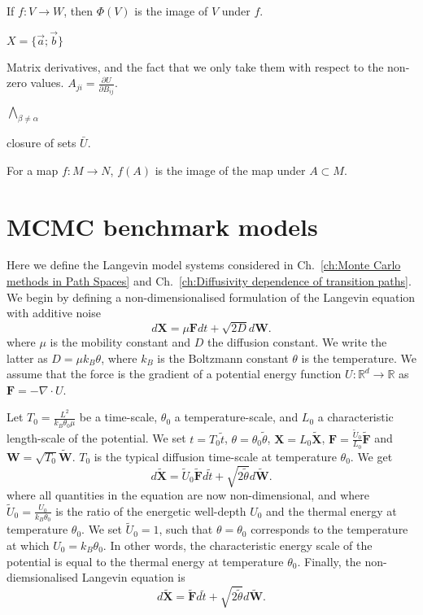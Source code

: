 \documentclass[withindex,glossary,techreport]{cam-thesis}
\begin{document}
If $f : V \to W$, then $\Phi(V)$ is the image of $V$ under $f$. 

$X = \{ \vec{a} ; \vec{b} \}$


Matrix derivatives, and the fact that we only take them with respect to the non-zero values. $A_{ji} = \frac{\partial U}{\partial B_{ij}}$.

$\bigwedge_{\beta \neq \alpha}$

closure of sets $\bar{U}$.

For a map $f : M \to N$, $f(A)$ is the image of the map under $A \subset M$.

\chapter{MCMC benchmark models} \label{app:MCMC benchmark models}

Here we define the Langevin model systems considered in Ch.~\ref{ch:Monte Carlo methods in Path Spaces} and Ch.~\ref{ch:Diffusivity dependence of transition paths}. We begin by defining a non-dimensionalised formulation of the Langevin equation with additive noise
\begin{equation}
d\mathbf{X}=\mu\mathbf{F}dt+\sqrt{2D}d\mathbf{W}.
\end{equation}
where $\mu$ is the mobility constant and $D$ the diffusion constant. We write the latter as $D = \mu k_B \theta$, where $k_B$ is the Boltzmann constant $\theta$ is the temperature. We assume that the force is the gradient of a potential energy function $U : \mathbb{R}^d \to \mathbb{R}$  as $\mathbf{F} = - \nabla \cdot U$.

Let $T_{0}=\frac{L^{2}}{k_{B}\theta_{0}\mu}$ be a time-scale, $\theta_{0}$ a temperature-scale, and $L_0$ a characteristic length-scale of the potential. We set $t=T_{0}\tilde{t}$,
$\theta=\theta_{0}\tilde{\theta}$, $\mathbf{X}=L_0 \tilde{\mathbf{X}}$,
$\mathbf{F}= \frac{\tilde{U}_0}{L_0} \tilde{\mathbf{F}}$ and $\mathbf{W}=\sqrt{T_{0}}\tilde{\mathbf{W}}$. $T_{0}$ is the typical diffusion time-scale at temperature $\theta_{0}$. We get
\begin{equation}
	d\mathbf{\tilde{X}}=\tilde{U}_{0} \tilde{\mathbf{F}}d\tilde{t}+\sqrt{2\tilde{\theta}}d\tilde{\mathbf{W}}.
\end{equation}
where all quantities in the equation are now non-dimensional, and where $\tilde{U}_{0}=\frac{U_{0}}{k_{B}\theta_{0}}$ is the ratio
of the energetic well-depth $U_{0}$ and the thermal energy at temperature $\theta_{0}$. We set $\tilde{U}_0 = 1$, such that $\theta = \theta_0$ corresponds to the temperature at which $U_0 = k_B \theta_0$. In other words, the characteristic energy scale of the potential is equal to the thermal energy at temperature $\theta_0$. Finally, the non-diemsionalised Langevin equation is
\begin{equation}
	d\mathbf{\tilde{X}}= \tilde{\mathbf{F}}d\tilde{t}+\sqrt{2\tilde{\theta}}d\tilde{\mathbf{W}}.
\end{equation}
\end{document}
